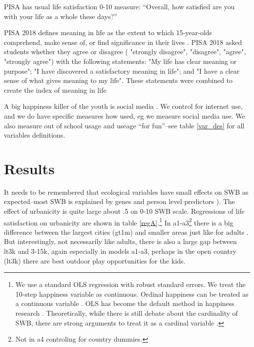 \documentclass[10pt, letterpaper]{article}
\begin{document}
\begin{spacing}{1.4}
PISA has usual life satisfaction 0-10 measure: ``Overall, how satisfied are you
with your life as a whole these days?'' 

PISA 2018 defines meaning in life as the extent to which 15-year-olds
comprehend, make sense of, or find significance in their lives
\citep{pisa18}. PISA 2018 asked students whether they agree or disagree (
"strongly disagree", "disagree", "agree", "strongly agree") with the following
statements: "My life has clear meaning or purpose"; "I have discovered a
satisfactory meaning in life"; and "I have a clear sense of what gives meaning
to my life". These statements were combined to create the index of meaning in
life

A big happiness killer of the youth is social media
\cite{twengeATL17sep,twenge14}.
We control for internet use, and we do  have specific measures how used, eg we
 measure social media use.  We also measure out of school usage and useage ``for
 fun''--see table \ref{var_des} for all variables definitions. 


 
 

\section*{Results}


 It needs to be remembered
that ecological variables have small effects on SWB as
 expected--most SWB is explained by genes \citep{schnittker08} and person level
 predictors \citep{veenhoven14b}). %
  The effect of urbanicity is quite large about .5 on 0-10 SWB scale.
 Regressions of life satisfaction on urbanicity are shown in table \ref{regA}.\footnote{We use a standard OLS regression with robust standard errors.  We treat the 10-step
happiness variable as continuous. Ordinal happiness can be treated as a
continuous variable \citep{carbonell04}.
%                                                                                                                  
OLS has become the default method in happiness research
\citep{blanchflower11}. Theoretically, while there is still debate about the
cardinality of SWB, there are strong arguments to treat it as a cardinal
variable \citep{ng96,ng97}.
}
 In a1-a3\footnote{Not
in a4 controling for country dummies.} there is a big
difference between the largest cities (gt1m) and smaller areas just like for
adults \citep{aok-ls_fisher16}. But interestingly, not necessarily like adults,
there is also a large gap between lt3k and 3-15k, again especially in models
a1-a3, perhaps in the open country (lt3k) there are best outdoor play opportunities for
the kids.


\end{spacing}
\end{document}
